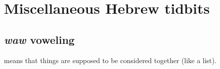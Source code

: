 \section{Miscellaneous Hebrew tidbits}\label{app:misc-heb}\thispagestyle{fancy}
\subsection{\textit{waw} voweling}\label{app:waw-voweling}
 means that things are supposed to be considered together (like a list).

